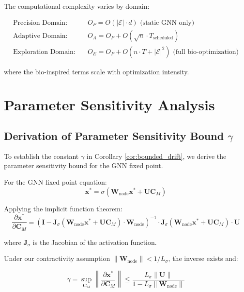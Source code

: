 \documentclass{article}
\begin{document}
\begin{theorem}
\label{thm:domain_complexity_extended}
The computational complexity varies by domain:

\begin{align}
\text{Precision Domain:} \quad &O_P = O(|\mathcal{E}| \cdot d) \text{ (static GNN only)} \\
\text{Adaptive Domain:} \quad &O_A = O_P + O(\sqrt{n} \cdot T_{\text{scheduled}}) \\
\text{Exploration Domain:} \quad &O_E = O_P + O(n \cdot T + |\mathcal{E}|^2) \text{ (full bio-optimization)}
\end{align}

where the bio-inspired terms scale with optimization intensity.
\end{theorem}

\section{Parameter Sensitivity Analysis}

\subsection{Derivation of Parameter Sensitivity Bound $\gamma$}

To establish the constant $\gamma$ in Corollary \ref{cor:bounded_drift}, we derive the parameter sensitivity bound for the GNN fixed point.

For the GNN fixed point equation:
\begin{equation}
\mathbf{x}^* = \sigma(\mathbf{W}_{\text{node}}\mathbf{x}^* + \mathbf{U}\mathbf{C}_M)
\end{equation}

Applying the implicit function theorem:
\begin{equation}
\frac{\partial \mathbf{x}^*}{\partial \mathbf{C}_M} = (\mathbf{I} - \mathbf{J}_\sigma(\mathbf{W}_{\text{node}}\mathbf{x}^* + \mathbf{U}\mathbf{C}_M) \cdot \mathbf{W}_{\text{node}})^{-1} \cdot \mathbf{J}_\sigma(\mathbf{W}_{\text{node}}\mathbf{x}^* + \mathbf{U}\mathbf{C}_M) \cdot \mathbf{U}
\end{equation}

where $\mathbf{J}_\sigma$ is the Jacobian of the activation function.

Under our contractivity assumption $\|\mathbf{W}_{\text{node}}\| < 1/L_\sigma$, the inverse exists and:

\begin{equation}
\gamma = \sup_{\mathbf{C}_M} \left\|\frac{\partial \mathbf{x}^*}{\partial \mathbf{C}_M}\right\| \leq \frac{L_\sigma\|\mathbf{U}\|}{1 - L_\sigma\|\mathbf{W}_{\text{node}}\|}
\end{equation}
\end{document}
